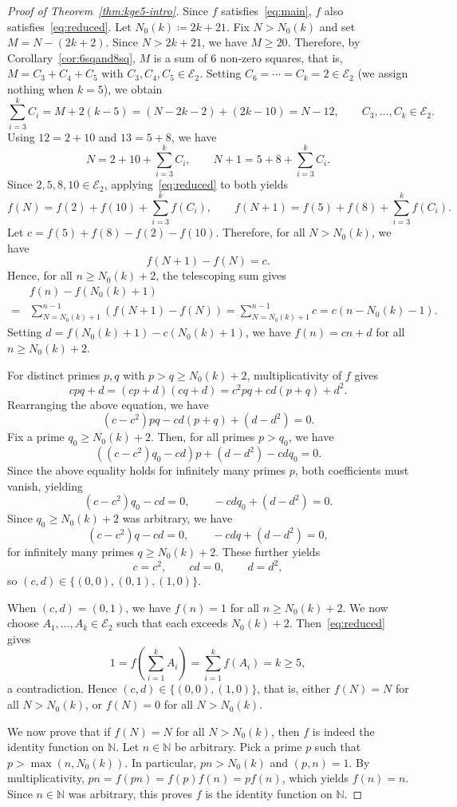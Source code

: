 \documentclass[10pt,a4paper]{amsart}
\newcommand{\E}{\mathcal{E}}
\newcommand{\N}{\mathbb{N}}
\begin{document}
\begin{proof}[Proof of Theorem~\ref{thm:kge5-intro}]
Since $f$ satisfies~\eqref{eq:main}, $f$ also satisfies~\eqref{eq:reduced}. Let $N_0(k) \coloneqq 2k + 21$. Fix $N > N_0(k)$ and set $M = N - (2k+2)$. Since $N > 2k+21$, we have $M \ge 20$. Therefore, by Corollary~\ref{cor:6sqand8sq}, $M$ is a sum of $6$ non-zero squares, that is,
$M = C_3 + C_4 + C_5$ with $C_3, C_4, C_5 \in \E_2$. Setting $C_6 = \cdots = C_k = 2 \in \E_2$
(we assign nothing when $k = 5$), we obtain
\[
    \sum_{i=3}^{k} C_i = M + 2(k-5) = (N - 2k - 2) + (2k - 10) = N - 12,
    \qquad C_3,\dots,C_k \in \E_2 .
\]
Using $12 = 2 + 10$ and $13 = 5 + 8$, we have
\[
    N = 2 + 10 + \sum_{i=3}^k C_i, \qquad N + 1 = 5 + 8 + \sum_{i=3}^k C_i .
\]
Since $2,5,8,10 \in \E_{2}$, applying~\eqref{eq:reduced} to both yields
\[
    f(N) = f(2) + f(10) + \sum_{i=3}^k f(C_i), \qquad
    f(N + 1) = f(5) + f(8) + \sum_{i=3}^k f(C_i).
\]
Let $c = f(5) + f(8) - f(2) - f(10)$. Therefore, for all $N > N_0(k)$, we have
\[
    f(N+1) - f(N) = c.
\]
Hence, for all $n \ge N_{0}(k)+2$, the telescoping sum gives
\begin{align}
    &f(n)-f(N_0(k) + 1)\\
    =&\sum_{N=N_{0}(k)+1}^{n-1}(f(N+1) - f(N)) =\sum_{N=N_{0}(k)+1}^{n-1} c=c(n-N_{0}(k)-1).
\end{align}
Setting $d = f(N_0(k) + 1) - c(N_0(k) + 1)$, we have $f(n) = cn + d$ for all $n \ge  N_0(k)+2$.


For distinct primes $p, q$ with $p > q \ge N_0(k)+2$, multiplicativity of $f$ gives
\[
    cpq + d = (cp + d)(cq + d) = c^2 pq + cd(p + q) + d^2.
\]
Rearranging the above equation, we have
\[
    (c - c^2)pq - cd(p + q) + (d - d^2) = 0.
\]
Fix a prime $q_0\ge N_0(k)+2$. Then, for all primes $p>q_0$, we have
\[
    ((c - c^2)q_{0} - cd)p + (d - d^2) -cd q_{0} = 0.
\]
Since the above equality holds for infinitely many primes $p$, both coefficients must vanish, yielding
\[
    (c - c^2)q_{0} - cd=0, \qquad -cd q_{0} + (d - d^2)=0.
\]
Since $q_0\ge N_0(k)+2$ was arbitrary, we have
\[
    (c - c^2)q - cd=0, \qquad -cd q + (d - d^2)=0,
\]
for infinitely many primes $q\ge N_0(k)+2$. These further yields
\[
    c = c^2, \qquad cd = 0, \qquad d = d^2,
\]
so $(c, d) \in \{(0,0), (0,1), (1,0)\}$.

When $(c,d) = (0,1)$, we have $f(n) = 1$ for all $n \ge N_0(k)+2$. We now choose $A_1, \dots, A_k \in \E_2$ such that each exceeds $N_0(k)+2$. Then~\eqref{eq:reduced} gives \[1=f(\sum_{i=1}^{k}A_i)=\sum_{i=1}^{k} f(A_i) = k \ge 5,\] a contradiction. Hence $(c,d) \in \{(0,0),(1,0)\}$, that is, either $f(N) = N$ for all $N > N_0(k)$, or $f(N) = 0$ for all $N > N_0(k)$.

We now prove that if $f(N) = N$ for all $N > N_0(k)$, then $f$ is indeed the identity function on $\N$. Let $n\in \N$ be arbitrary. Pick a prime $p$ such that $p>\max (n,N_{0}(k))$. In particular, $pn>N_{0}(k)$ and $(p,n)=1$. By multiplicativity, $pn=f(pn)=f(p)f(n)=pf(n)$, which yields $f(n)=n$. Since $n\in \N$ was arbitrary, this proves $f$ is the identity function on $\N$.
\end{proof}
\end{document}
